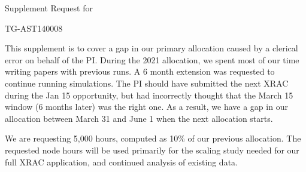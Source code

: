 \documentclass[11pt]{NSF}  %
\begin{document}
\begin{centering}
\begin{LARGE}
Supplement Request for

TG-AST140008

\end{LARGE}
\end{centering}


\pagestyle{plain}

This supplement is to cover a gap in our primary allocation caused by a clerical
error on behalf of the PI.  During the 2021 allocation, we spent most of our
time writing papers with previous runs.  A 6 month extension was requested to
continue running simulations.  The PI should have submitted the next XRAC during
the Jan 15 opportunity, but had incorrectly thought that the March 15 window (6
months later) was the right one.  As a result, we have a gap in our allocation
between March 31 and June 1 when the next allocation starts.  

We are requesting 5,000 hours, computed as 10\% of our previous allocation.
The requested node hours will be used primarily for the scaling study needed for
our full XRAC application, and continued analysis of existing data.



%
\end{document}
